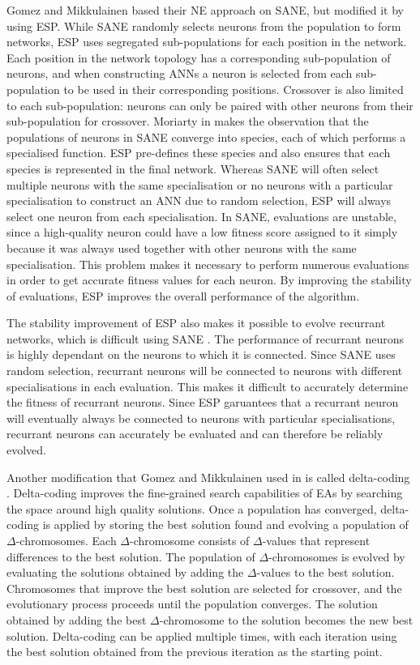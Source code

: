 \documentclass[12pt]{article} %
\begin{document}
Gomez and Mikkulainen based their NE approach on SANE, but modified it by using ESP. While SANE randomly selects neurons from the population to form networks, ESP uses segregated sub-populations for each position in the network. Each position in the network topology has a corresponding sub-population of neurons, and when constructing ANNs a neuron is selected from each sub-population to be used in their corresponding positions. Crossover is also limited to each sub-population: neurons can only be paired with other neurons from their sub-population for crossover. Moriarty in \cite{Moriarty1997} makes the observation that the populations of neurons in SANE converge into species, each of which performs a specialised function. ESP pre-defines these species and also ensures that each species is represented in the final network. Whereas SANE will often select multiple neurons with the same specialisation or no neurons with a particular specialisation to construct an ANN due to random selection, ESP will always select one neuron from each specialisation. In SANE, evaluations are unstable, since a high-quality neuron could have a low fitness score assigned to it simply because it was always used together with other neurons with the same specialisation. This problem makes it necessary to perform numerous evaluations in order to get accurate fitness values for each neuron. By improving the stability of evaluations, ESP improves the overall performance of the algorithm.

The stability improvement of ESP also makes it possible to evolve recurrant networks, which is difficult using SANE \cite{Gomez1997}. The performance of recurrant neurons is highly dependant on the neurons to which it is connected. Since SANE uses random selection, recurrant neurons will be connected to neurons with different specialisations in each evaluation. This makes it difficult to accurately determine the fitness of recurrant neurons. Since ESP garuantees that a recurrant neuron will eventually always be connected to neurons with particular specialisations, recurrant neurons can accurately be evaluated and can therefore be reliably evolved.

Another modification that Gomez and Mikkulainen used in \cite{Gomez1997} is called delta-coding \cite{Whitley1991}. Delta-coding improves the fine-grained search capabilities of EAs by searching the space around high quality solutions. Once a population has converged, delta-coding is applied by storing the best solution found and evolving a population of $\Delta$-chromosomes. Each $\Delta$-chromosome consists of $\Delta$-values that represent differences to the best solution. The population of $\Delta$-chromosomes is evolved by evaluating the solutions obtained by adding the $\Delta$-values to the best solution. Chromosomes that improve the best solution are selected for crossover, and the evolutionary process proceeds until the population converges. The solution obtained by adding the best $\Delta$-chromosome to the solution becomes the new best solution. Delta-coding can be applied multiple times, with each iteration using the best solution obtained from the previous iteration as the starting point.
\end{document}
